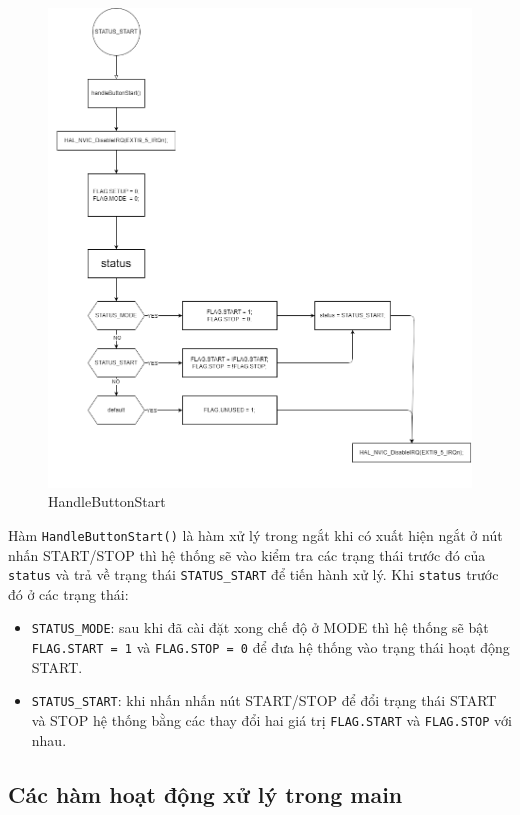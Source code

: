 \begin{figure}[H]
	\centering
	\includegraphics[width=\linewidth]{./diagram/handleButtonStart.png}
	\caption{HandleButtonStart}
	\label{f_handlebuttonstart}
\end{figure}

Hàm \texttt{HandleButtonStart()} là hàm xử lý trong ngắt khi có xuất hiện ngắt ở nút nhấn START/STOP thì hệ thống sẽ vào kiểm tra các trạng thái trước đó của \texttt{status} và trả về trạng thái \texttt{STATUS\_START} để tiến hành xử lý. Khi \texttt{status} trước đó ở các trạng thái:

\begin{itemize}[label = -]
	\item \texttt{STATUS\_MODE}: sau khi đã cài đặt xong chế độ ở MODE thì hệ thống sẽ bật \texttt{FLAG.START = 1} và \texttt{FLAG.STOP = 0} để đưa hệ thống vào trạng thái hoạt động START.
	\item \texttt{STATUS\_START}: khi nhấn nhấn nút START/STOP để đổi trạng thái START và STOP hệ thống bằng các thay đổi hai giá trị \texttt{FLAG.START} và \texttt{FLAG.STOP} với nhau.
\end{itemize}

\subsection{Các hàm hoạt động xử lý trong main}

